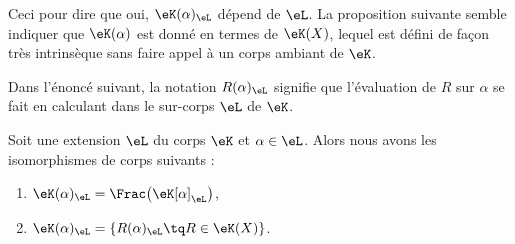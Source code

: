 Ceci pour dire que oui, \( \eK(\alpha)_{\eL}\) dépend de \( \eL\). La proposition suivante semble indiquer que \( \eK(\alpha)\) est donné en termes de \( \eK(X)\), lequel est défini de façon très intrinsèque sans faire appel à un corps ambiant de \( \eK\).

Dans l'énoncé suivant, la notation \( R(\alpha)_{\eL}\) signifie que l'évaluation de \( R\) sur \( \alpha\) se fait en calculant dans le sur-corps \( \eL\) de \( \eK\).

\begin{proposition}     \label{PROPooYSFNooFGbbCi}
    Soit une extension \( \eL\) du corps \( \eK\) et \( \alpha\in \eL\). Alors nous avons les isomorphismes de corps suivants :
    \begin{enumerate}
        \item
            \( \eK(\alpha)_{\eL}=\Frac\big( \eK[\alpha]_{\eL} \big)\),
        \item       \label{ITEMooATPTooVXKdlK}
            \( \eK(\alpha)_{\eL}=\{ R(\alpha)_{\eL}\tq R\in \eK(X) \}\).
    \end{enumerate}
\end{proposition}


